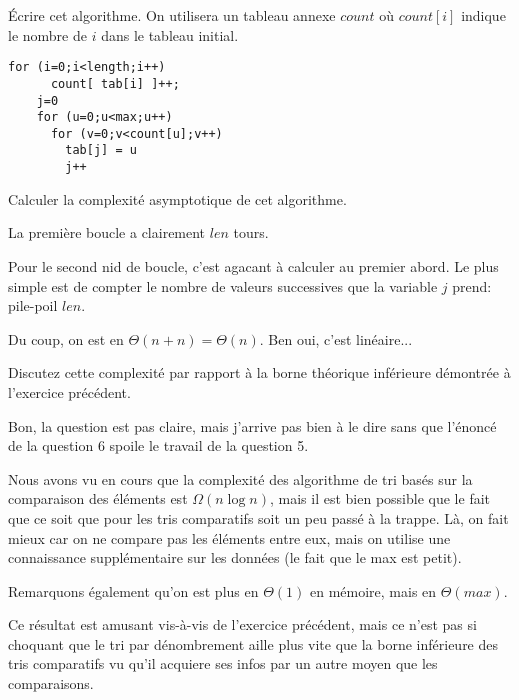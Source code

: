 \documentclass[10pt]{article}\usepackage[correction]{esial}
\begin{document}
\Question Écrire cet algorithme. On utilisera un tableau annexe $count$ où
$count[i]$ indique le nombre de $i$ dans le tableau initial.

\begin{Reponse}
  \begin{Verbatim}[gobble=4]
    for (i=0;i<length;i++)
      count[ tab[i] ]++;
    j=0
    for (u=0;u<max;u++)
      for (v=0;v<count[u];v++) 
        tab[j] = u
        j++ 
  \end{Verbatim}
\end{Reponse}

\Question Calculer la complexité asymptotique de cet algorithme.

\begin{Reponse}
  La première boucle a clairement $len$ tours. 
 
  Pour le second nid de boucle, c'est agacant à calculer au premier abord. Le
  plus simple est de compter le nombre de valeurs successives que la variable
  $j$ prend: pile-poil $len$.

  Du coup, on est en $\Theta(n+n)=\Theta(n)$. Ben oui, c'est linéaire...

\end{Reponse}

\Question Discutez cette complexité par rapport à la borne théorique
inférieure démontrée à l'exercice précédent. 

\begin{Reponse}
  Bon, la question est pas claire, mais j'arrive pas bien à le dire sans que
  l'énoncé de la question 6 spoile le travail de la question 5.

  Nous avons vu en cours que la complexité des algorithme de tri basés sur la
  comparaison des éléments est $\Omega(n\log n)$, mais il est bien possible que
  le fait que ce soit que pour les tris comparatifs soit un peu passé à la
  trappe. Là, on fait mieux car on ne compare pas les éléments entre eux, mais
  on utilise une connaissance supplémentaire sur les données (le fait que le
  max est petit).

  Remarquons également qu'on est plus en $\Theta(1)$ en mémoire, mais en
  $\Theta(max)$.
  \bigskip

  Ce résultat est amusant vis-à-vis de l'exercice précédent, mais ce n'est pas
  si choquant que le tri par dénombrement aille plus vite que la borne
  inférieure des tris comparatifs vu qu'il acquiere ses infos par un autre
  moyen que les comparaisons.
\end{Reponse}
\end{document}
